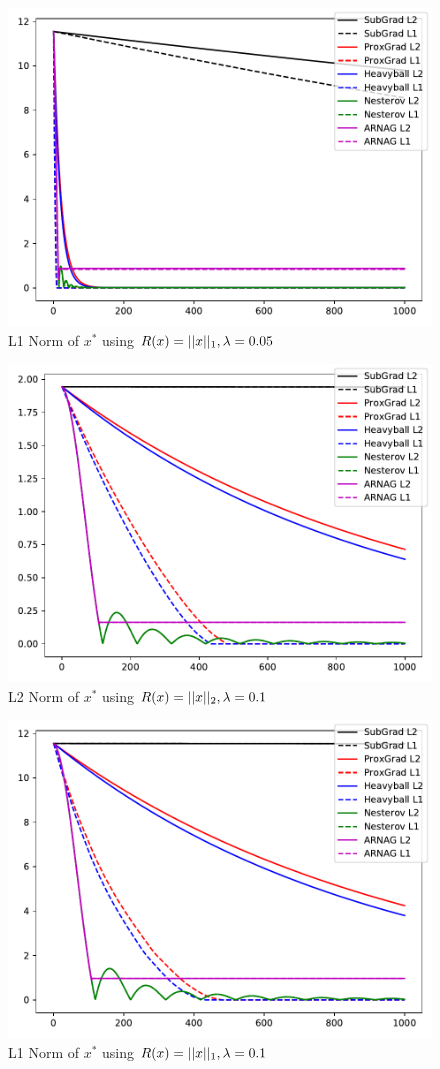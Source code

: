 \documentclass[11pt, answers]{exam}
\begin{document}
		\begin{figure}[H]
		\centering
		\includegraphics[width=.75\textwidth]{../out/05xl1.pdf}
		\caption{L1 Norm of $x^*$ using $R(x)=|| x ||_1,\lambda=0.05$}
		\end{figure}		\begin{figure}[H]
		\centering
		\includegraphics[width=.75\textwidth]{../out/xl2.pdf}
		\caption{L2 Norm of $x^*$ using $R(x)=|| x ||_2,\lambda=0.1$}
		\end{figure}
		\begin{figure}[H]
		\centering
		\includegraphics[width=.75\textwidth]{../out/xl1.pdf}
		\caption{L1 Norm of $x^*$ using $R(x)=|| x ||_1,\lambda=0.1$}
		\end{figure}
\end{document}

